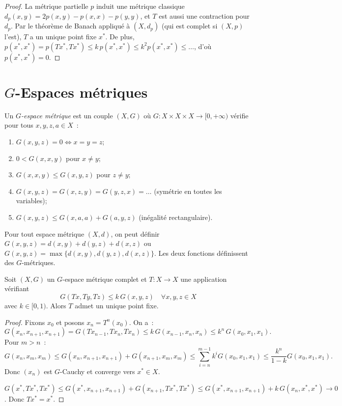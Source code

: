 \begin{proof}
La m\'etrique partielle $p$ induit une m\'etrique classique
$d_p(x, y) = 2p(x, y) - p(x, x) - p(y, y)$, et $T$ est aussi une contraction
pour $d_p$. Par le th\'eor\`eme de Banach appliqu\'e \`a $(X, d_p)$ (qui est
complet si $(X, p)$ l'est), $T$ a un unique point fixe $x^*$.
De plus, $p(x^*, x^*) = p(Tx^*, Tx^*) \leq k \, p(x^*, x^*) \leq k^2 p(x^*, x^*)
\leq \ldots$, d'o\`u $p(x^*, x^*) = 0$.
\end{proof}

\section{$G$-Espaces m\'etriques}

\begin{definition}
Un \emph{$G$-espace m\'etrique} est un couple $(X, G)$ o\`u
$G : X \times X \times X \to [0, +\infty)$ v\'erifie pour tous $x, y, z, a \in X$~:
\begin{enumerate}
    \item $G(x, y, z) = 0 \Leftrightarrow x = y = z$;
    \item $0 < G(x, x, y)$ pour $x \neq y$;
    \item $G(x, x, y) \leq G(x, y, z)$ pour $z \neq y$;
    \item $G(x, y, z) = G(x, z, y) = G(y, z, x) = \ldots$ (sym\'etrie en toutes les variables);
    \item $G(x, y, z) \leq G(x, a, a) + G(a, y, z)$ (in\'egalit\'e rectangulaire).
\end{enumerate}
\end{definition}

\begin{exemple}
Pour tout espace m\'etrique $(X, d)$, on peut d\'efinir
$G(x, y, z) = d(x, y) + d(y, z) + d(x, z)$ ou
$G(x, y, z) = \max\{d(x,y), d(y,z), d(x,z)\}$. Les deux fonctions
d\'efinissent des $G$-m\'etriques.
\end{exemple}

\begin{theoreme}
Soit $(X, G)$ un $G$-espace m\'etrique complet et $T : X \to X$ une application
v\'erifiant
\[
    G(Tx, Ty, Tz) \leq k \, G(x, y, z) \quad \forall x, y, z \in X
\]
avec $k \in [0, 1)$. Alors $T$ admet un unique point fixe.
\end{theoreme}

\begin{proof}
Fixons $x_0$ et posons $x_n = T^n(x_0)$. On a~:
\[
    G(x_n, x_{n+1}, x_{n+1}) = G(Tx_{n-1}, Tx_n, Tx_n) \leq k \, G(x_{n-1}, x_n, x_n)
    \leq k^n \, G(x_0, x_1, x_1).
\]
Pour $m > n$~:
\[
    G(x_n, x_m, x_m) \leq G(x_n, x_{n+1}, x_{n+1}) + G(x_{n+1}, x_m, x_m)
    \leq \sum_{i=n}^{m-1} k^i G(x_0, x_1, x_1) \leq \frac{k^n}{1-k} G(x_0, x_1, x_1).
\]
Donc $(x_n)$ est $G$-Cauchy et converge vers $x^* \in X$.

$G(x^*, Tx^*, Tx^*) \leq G(x^*, x_{n+1}, x_{n+1}) + G(x_{n+1}, Tx^*, Tx^*)
\leq G(x^*, x_{n+1}, x_{n+1}) + k \, G(x_n, x^*, x^*) \to 0$.
Donc $Tx^* = x^*$.
\end{proof}

